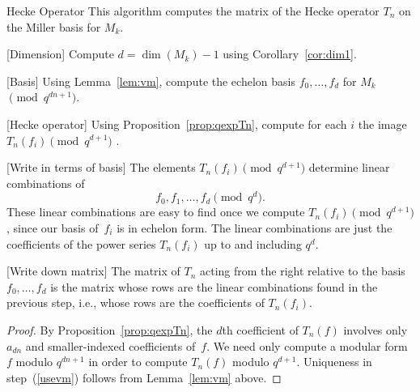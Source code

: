 \begin{algorithm}{Hecke Operator}
  This algorithm computes the matrix of the Hecke operator $T_n$ on the
 Miller basis for $M_k$.
\begin{steps}
\item{}[Dimension] Compute $d= \dim(M_k)-1$ using
  Corollary~\ref{cor:dim1}.
\item{}[Basis] Using 
  Lemma~\ref{lem:vm}, compute the echelon 
  basis $f_0,\ldots, f_d$ for $M_k$ $\pmod{q^{dn+1}}$.
\item{}[Hecke operator] Using 
  Proposition~\ref{prop:qexpTn}, compute for
  each $i$ the image $T_n(f_i) \pmod{q^{d+1}}$ .
\item{}[Write in terms of basis]\label{usevm} The elements 
  $T_n(f_i) \pmod{q^{d+1}}$
  determine linear combinations of $$f_0,f_1,\ldots, f_d
  \pmod{q^d}.$$  These linear combinations are easy to find
once we compute $T_n(f_i) \pmod{q^{d+1}}$,
since our basis of~$f_i$ is in echelon form.
The linear combinations are just the coefficients 
of the power series $T_n(f_i)$ up to and including $q^d$.
\item{}[Write down matrix] The matrix of $T_n$ acting from the right
  relative to the basis $f_0, \ldots, f_d$ is the matrix whose rows
  are the linear combinations found in the previous step, i.e., whose
  rows are the coefficients of $T_n(f_i)$.
\end{steps}
\end{algorithm}
\begin{proof}
  By Proposition~\ref{prop:qexpTn}, the $d$th coefficient
  of $T_n(f)$ involves only $a_{dn}$ and smaller-indexed coefficients
  of~$f$. We need only compute a modular form~$f$ modulo $q^{dn+1}$ in
  order to compute $T_n(f)$ modulo $q^{d+1}$.
  Uniqueness in step~(\ref{usevm}) follows from Lemma~\ref{lem:vm}
  above.
\end{proof}


